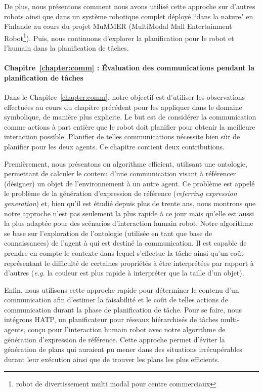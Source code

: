 De plus, nous présentons comment nous avons utilisé cette approche sur d'autres robots ainsi que dans un système robotique complet déployé ``dans la nature" en Finlande au cours du projet MuMMER (MultiModal Mall Entertainment Robot\footnote{robot de divertissement multi modal pour centre commerciaux}). Puis, nous continuons d'explorer la planification pour le robot et l'humain dans la planification de tâches.


\paragraph{Chapitre~\ref{chapter:comm} : Évaluation des communications pendant la planification de tâches}
Dans le Chapitre~\ref{chapter:comm}, notre objectif est d'utiliser les observations effectuées au cours du chapitre précédent pour les appliquer dans le domaine symbolique, de manière plus explicite. Le but est de considérer la communication comme actions à part entière que le robot doit planifier pour obtenir la meilleure interaction possible. Planifier de telles communications nécessite bien sûr de planifier pour les deux agents. Ce chapitre contient deux contributions. 

Premièrement, nous présentons on algorithme efficient, utilisant une ontologie, permettant de calculer le contenu d'une communication visant à référencer (désigner) un objet de l’environnement à un autre agent. Ce problème est appelé le problème de la génération d'expression de référence (\textit{referring expression generation}) et, bien qu'il est étudié depuis plus de trente ans, nous montrons que notre approche n'est pas seulement la plus rapide à ce jour mais qu'elle est aussi la plus adaptée pour des scénarios d'interaction humain robot. Notre algorithme se base sur l'exploration de l'ontologie (utilisée en tant que base de connaissances) de l'agent à qui est destiné la communication. Il est capable de prendre en compte le contexte dans lequel s'effectue la tâche ainsi qu'un coût représentant le difficulté de certaines propriétés à être interprétées par rapport à d'autres (\textit{e.g.} la couleur est plus rapide à interpréter que la taille d'un objet).

Enfin, nous utilisons cette approche rapide pour déterminer le contenu d'un communication afin d'estimer la faisabilité et le coût de telles actions de communication durant la phase de planification de tâche. Pour se faire, nous intégrons HATP, un planificateur pour réseaux hiérarchisés de tâches multi-agents, conçu pour l'interaction humain robot avec notre algorithme de génération d'expression de référence. Cette approche permet d'éviter la génération de plans qui auraient pu mener dans des situations irrécupérables durant leur exécution ainsi que de trouver les plans les plus efficients.

